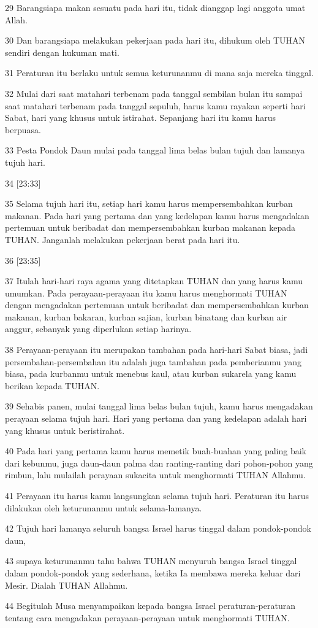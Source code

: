 \par 29 Barangsiapa makan sesuatu pada hari itu, tidak dianggap lagi anggota umat Allah.
\par 30 Dan barangsiapa melakukan pekerjaan pada hari itu, dihukum oleh TUHAN sendiri dengan hukuman mati.
\par 31 Peraturan itu berlaku untuk semua keturunanmu di mana saja mereka tinggal.
\par 32 Mulai dari saat matahari terbenam pada tanggal sembilan bulan itu sampai saat matahari terbenam pada tanggal sepuluh, harus kamu rayakan seperti hari Sabat, hari yang khusus untuk istirahat. Sepanjang hari itu kamu harus berpuasa.
\par 33 Pesta Pondok Daun mulai pada tanggal lima belas bulan tujuh dan lamanya tujuh hari.
\par 34 [23:33]
\par 35 Selama tujuh hari itu, setiap hari kamu harus mempersembahkan kurban makanan. Pada hari yang pertama dan yang kedelapan kamu harus mengadakan pertemuan untuk beribadat dan mempersembahkan kurban makanan kepada TUHAN. Janganlah melakukan pekerjaan berat pada hari itu.
\par 36 [23:35]
\par 37 Itulah hari-hari raya agama yang ditetapkan TUHAN dan yang harus kamu umumkan. Pada perayaan-perayaan itu kamu harus menghormati TUHAN dengan mengadakan pertemuan untuk beribadat dan mempersembahkan kurban makanan, kurban bakaran, kurban sajian, kurban binatang dan kurban air anggur, sebanyak yang diperlukan setiap harinya.
\par 38 Perayaan-perayaan itu merupakan tambahan pada hari-hari Sabat biasa, jadi persembahan-persembahan itu adalah juga tambahan pada pemberianmu yang biasa, pada kurbanmu untuk menebus kaul, atau kurban sukarela yang kamu berikan kepada TUHAN.
\par 39 Sehabis panen, mulai tanggal lima belas bulan tujuh, kamu harus mengadakan perayaan selama tujuh hari. Hari yang pertama dan yang kedelapan adalah hari yang khusus untuk beristirahat.
\par 40 Pada hari yang pertama kamu harus memetik buah-buahan yang paling baik dari kebunmu, juga daun-daun palma dan ranting-ranting dari pohon-pohon yang rimbun, lalu mulailah perayaan sukacita untuk menghormati TUHAN Allahmu.
\par 41 Perayaan itu harus kamu langsungkan selama tujuh hari. Peraturan itu harus dilakukan oleh keturunanmu untuk selama-lamanya.
\par 42 Tujuh hari lamanya seluruh bangsa Israel harus tinggal dalam pondok-pondok daun,
\par 43 supaya keturunanmu tahu bahwa TUHAN menyuruh bangsa Israel tinggal dalam pondok-pondok yang sederhana, ketika Ia membawa mereka keluar dari Mesir. Dialah TUHAN Allahmu.
\par 44 Begitulah Musa menyampaikan kepada bangsa Israel peraturan-peraturan tentang cara mengadakan perayaan-perayaan untuk menghormati TUHAN.

